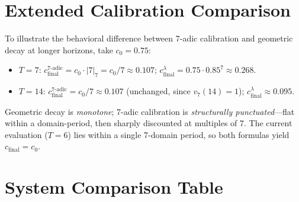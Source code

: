 \documentclass{llncs}
\begin{document}
\section{Extended Calibration Comparison}
\label{app:calibration}

To illustrate the behavioral difference between 7-adic calibration and geometric decay at longer horizons, take $c_0 = 0.75$:
\begin{itemize}
  \item $T=7$: $c_{\mathrm{final}}^{\text{7-adic}} = c_0 \cdot |7|_7 = c_0/7 \approx 0.107$; $c_{\mathrm{final}}^{\lambda} = 0.75 \cdot 0.85^7 \approx 0.268$.
  \item $T=14$: $c_{\mathrm{final}}^{\text{7-adic}} = c_0/7 \approx 0.107$ (unchanged, since $v_7(14)=1$); $c_{\mathrm{final}}^{\lambda} \approx 0.095$.
\end{itemize}
Geometric decay is \emph{monotone}; 7-adic calibration is \emph{structurally punctuated}---flat within a domain-period, then sharply discounted at multiples of 7. The current evaluation ($T=6$) lies within a single 7-domain period, so both formulas yield $c_{\mathrm{final}} = c_0$.

\section{System Comparison Table}
\label{app:system-comparison}
\end{document}
